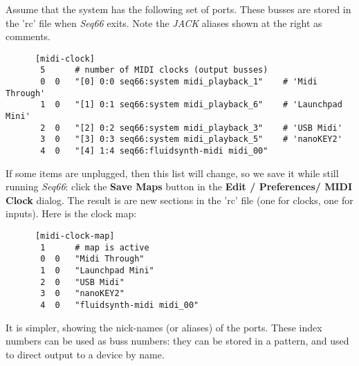    Assume that the system has the following set of ports.  These busses are
   stored in the 'rc' file when \textsl{Seq66} exits.  Note the \textsl{JACK}
   aliases shown at the right as comments.

   \begin{verbatim}
      [midi-clock]
       5      # number of MIDI clocks (output busses)
       0  0   "[0] 0:0 seq66:system midi_playback_1"    # 'Midi Through'
       1  0   "[1] 0:1 seq66:system midi_playback_6"    # 'Launchpad Mini'
       2  0   "[2] 0:2 seq66:system midi_playback_3"    # 'USB Midi'
       3  0   "[3] 0:3 seq66:system midi_playback_5"    # 'nanoKEY2'
       4  0   "[4] 1:4 seq66:fluidsynth-midi midi_00"
   \end{verbatim}

   If some items are unplugged, then this list will change, so we save it while
   still running \textsl{Seq66}:
   click the
   \textbf{Save Maps} button in the
   \textbf{Edit / Preferences/ MIDI Clock} dialog. 
   The result is are new sections in the 'rc' file (one for clocks, one for
   inputs).  Here is the clock map:

   \begin{verbatim}
      [midi-clock-map]
       1      # map is active
       0  0   "Midi Through"
       1  0   "Launchpad Mini"
       2  0   "USB Midi"
       3  0   "nanoKEY2"
       4  0   "fluidsynth-midi midi_00"
   \end{verbatim}
   
   It is simpler, showing the nick-names (or aliases) of the ports.
   These index numbers can be used as buss numbers: they can be stored
   in a pattern, and used to direct output to a
   device by name.




